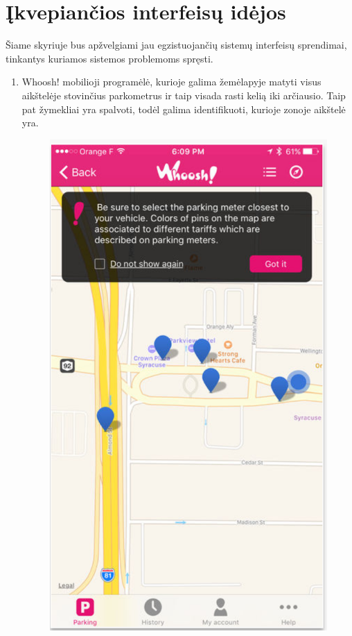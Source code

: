 \documentclass{VUMIFPSkursinis}
\begin{document}
\section{Įkvepiančios interfeisų idėjos}
Šiame skyriuje bus apžvelgiami jau egzistuojančių sistemų interfeisų sprendimai, tinkantys kuriamos sistemos problemoms spręsti.
\begin{enumerate}
	\item
		\begin{samepage}
			Whoosh! mobilioji programėlė, kurioje galima žemėlapyje matyti visus aikštelėje  stovinčius parkometrus ir taip visada rasti kelią iki arčiausio. Taip pat žymekliai yra spalvoti, todėl galima identifikuoti, kurioje zonoje aikštelė yra.
			\begin{figure}[H]
				\centering
				\includegraphics[scale=0.5]{img/whoosh}

\end{figure}
\end{samepage}
\end{enumerate}
\end{document}
